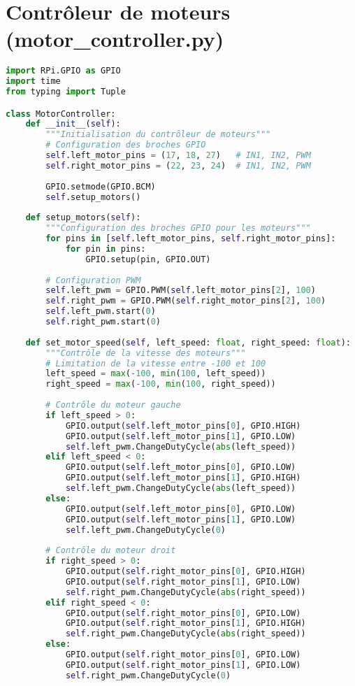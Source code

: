 \section{Contrôleur de moteurs (motor\_controller.py)}
\begin{lstlisting}[language=Python, caption=Contrôleur des moteurs, label=lst:motor-controller]
import RPi.GPIO as GPIO
import time
from typing import Tuple

class MotorController:
    def __init__(self):
        """Initialisation du contrôleur de moteurs"""
        # Configuration des broches GPIO
        self.left_motor_pins = (17, 18, 27)   # IN1, IN2, PWM
        self.right_motor_pins = (22, 23, 24)  # IN1, IN2, PWM
        
        GPIO.setmode(GPIO.BCM)
        self.setup_motors()
        
    def setup_motors(self):
        """Configuration des broches GPIO pour les moteurs"""
        for pins in [self.left_motor_pins, self.right_motor_pins]:
            for pin in pins:
                GPIO.setup(pin, GPIO.OUT)
        
        # Configuration PWM
        self.left_pwm = GPIO.PWM(self.left_motor_pins[2], 100)
        self.right_pwm = GPIO.PWM(self.right_motor_pins[2], 100)
        self.left_pwm.start(0)
        self.right_pwm.start(0)
    
    def set_motor_speed(self, left_speed: float, right_speed: float):
        """Contrôle de la vitesse des moteurs"""
        # Limitation de la vitesse entre -100 et 100
        left_speed = max(-100, min(100, left_speed))
        right_speed = max(-100, min(100, right_speed))
        
        # Contrôle du moteur gauche
        if left_speed > 0:
            GPIO.output(self.left_motor_pins[0], GPIO.HIGH)
            GPIO.output(self.left_motor_pins[1], GPIO.LOW)
            self.left_pwm.ChangeDutyCycle(abs(left_speed))
        elif left_speed < 0:
            GPIO.output(self.left_motor_pins[0], GPIO.LOW)
            GPIO.output(self.left_motor_pins[1], GPIO.HIGH)
            self.left_pwm.ChangeDutyCycle(abs(left_speed))
        else:
            GPIO.output(self.left_motor_pins[0], GPIO.LOW)
            GPIO.output(self.left_motor_pins[1], GPIO.LOW)
            self.left_pwm.ChangeDutyCycle(0)
        
        # Contrôle du moteur droit
        if right_speed > 0:
            GPIO.output(self.right_motor_pins[0], GPIO.HIGH)
            GPIO.output(self.right_motor_pins[1], GPIO.LOW)
            self.right_pwm.ChangeDutyCycle(abs(right_speed))
        elif right_speed < 0:
            GPIO.output(self.right_motor_pins[0], GPIO.LOW)
            GPIO.output(self.right_motor_pins[1], GPIO.HIGH)
            self.right_pwm.ChangeDutyCycle(abs(right_speed))
        else:
            GPIO.output(self.right_motor_pins[0], GPIO.LOW)
            GPIO.output(self.right_motor_pins[1], GPIO.LOW)
            self.right_pwm.ChangeDutyCycle(0)
    

\end{lstlisting}
